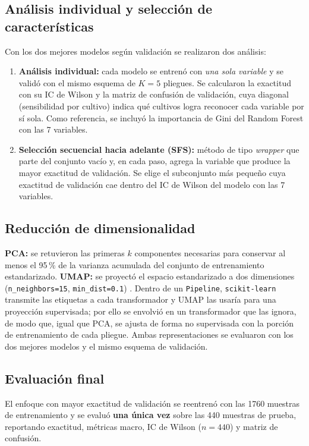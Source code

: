 \documentclass[conference]{IEEEtran}
\begin{document}
\subsection{Análisis individual y selección de características}

Con los dos mejores modelos según validación se realizaron dos análisis:
\begin{enumerate}
    \item \textbf{Análisis individual:} cada modelo se entrenó con \emph{una sola variable} y se validó con el mismo esquema de $K=5$ pliegues. Se calcularon la exactitud con su IC de Wilson y la matriz de confusión de validación, cuya diagonal (sensibilidad por cultivo) indica qué cultivos logra reconocer cada variable por sí sola. Como referencia, se incluyó la importancia de Gini del Random Forest con las 7 variables.
    \item \textbf{Selección secuencial hacia adelante (SFS):} método de tipo \emph{wrapper} \cite{guyon2003} que parte del conjunto vacío y, en cada paso, agrega la variable que produce la mayor exactitud de validación. Se elige el subconjunto más pequeño cuya exactitud de validación cae dentro del IC de Wilson del modelo con las 7 variables.
\end{enumerate}

\subsection{Reducción de dimensionalidad}

\textbf{PCA:} se retuvieron las primeras $k$ componentes necesarias para conservar al menos el 95\,\% de la varianza acumulada del conjunto de entrenamiento estandarizado. \textbf{UMAP:} se proyectó el espacio estandarizado a dos dimensiones (\texttt{n\_neighbors=15}, \texttt{min\_dist=0.1}) \cite{mcinnes2018}. Dentro de un \texttt{Pipeline}, \texttt{scikit-learn} transmite las etiquetas a cada transformador y UMAP las usaría para una proyección supervisada; por ello se envolvió en un transformador que las ignora, de modo que, igual que PCA, se ajusta de forma no supervisada con la porción de entrenamiento de cada pliegue. Ambas representaciones se evaluaron con los dos mejores modelos y el mismo esquema de validación.

\subsection{Evaluación final}

El enfoque con mayor exactitud de validación se reentrenó con las 1760 muestras de entrenamiento y se evaluó \textbf{una única vez} sobre las 440 muestras de prueba, reportando exactitud, métricas macro, IC de Wilson ($n=440$) y matriz de confusión.
\end{document}
